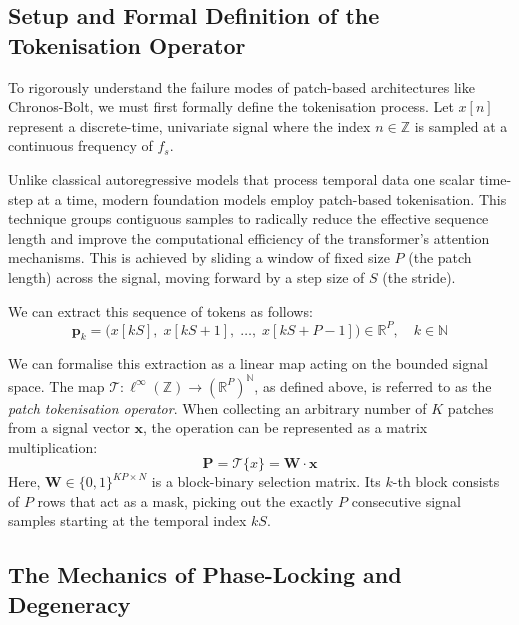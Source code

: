\subsection{Setup and Formal Definition of the Tokenisation Operator}

To rigorously understand the failure modes of patch-based architectures like Chronos-Bolt, we must first formally define the tokenisation process. Let $x[n]$ represent a discrete-time, univariate signal where the index $n \in \mathbb{Z}$ is sampled at a continuous frequency of $f_s$.

Unlike classical autoregressive models that process temporal data one scalar time-step at a time, modern foundation models employ patch-based tokenisation. This technique groups contiguous samples to radically reduce the effective sequence length and improve the computational efficiency of the transformer's attention mechanisms. This is achieved by sliding a window of fixed size $P$ (the patch length) across the signal, moving forward by a step size of $S$ (the stride).

We can extract this sequence of tokens as follows:
\begin{equation}
    \mathbf{p}_k = \bigl(x[kS],\; x[kS+1],\; \ldots,\; x[kS+P-1]\bigr) \in \mathbb{R}^P, \quad k \in \mathbb{N}
\end{equation}

\begin{definition}
    We can formalise this extraction as a linear map acting on the bounded signal space. The map $\mathcal{T}: \ell^\infty(\mathbb{Z}) \to (\mathbb{R}^P)^{\mathbb{N}}$, as defined above, is referred to as the \emph{patch tokenisation operator}. When collecting an arbitrary number of $K$ patches from a signal vector $\mathbf{x}$, the operation can be represented as a matrix multiplication:
    \begin{equation}
        \mathbf{P} = \mathcal{T}\{x\} = \mathbf{W} \cdot \mathbf{x}
    \end{equation}
    Here, $\mathbf{W} \in \{0,1\}^{KP \times N}$ is a block-binary selection matrix. Its $k$-th block consists of $P$ rows that act as a mask, picking out the exactly $P$ consecutive signal samples starting at the temporal index $kS$.
\end{definition}

\subsection{The Mechanics of Phase-Locking and Degeneracy}


